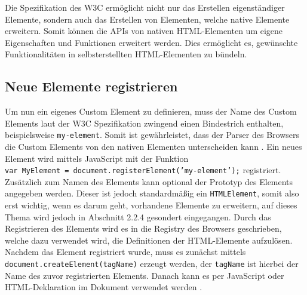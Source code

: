 \begin{Shaded}
\begin{Highlighting}[]
  \KeywordTok{>}
\KeywordTok{>}
\end{Highlighting}
\end{Shaded}

Die Spezifikation des W3C ermöglicht nicht nur das Erstellen eigenständiger Elemente, sondern auch das Erstellen von Elementen, welche native Elemente erweitern. Somit können die APIs von nativen HTML-Elementen um eigene Eigenschaften und Funktionen erweitert werden. Dies ermöglicht es, gewünschte Funktionalitäten in selbsterstellten HTML-Elementen zu bündeln.

\subsection{Neue Elemente registrieren}\label{neue-elemente-registrieren}

Um nun ein eigenes Custom Element zu definieren, muss der Name des Custom Elements laut der W3C Spezifikation zwingend einen Bindestrich enthalten, beispielsweise \texttt{my-element}. Somit ist gewährleistet, dass der Parser des Browsers die Custom Elements von den nativen Elementen unterscheiden kann \cite{citeulike:13845061}. Ein neues Element wird mittels JavaScript mit der Funktion \texttt{var\ MyElement\ =\ document.registerElement('my-element');} registriert. Zusätzlich zum Namen des Elements kann optional der Prototyp des Elements angegeben werden. Dieser ist jedoch standardmäßig ein \texttt{HTMLElement}, somit also erst wichtig, wenn es darum geht, vorhandene Elemente zu erweitern, auf dieses Thema wird jedoch in Abschnitt 2.2.4 gesondert eingegangen. Durch das Registrieren des Elements wird es in die Registry des Browsers geschrieben, welche dazu verwendet wird, die Definitionen der HTML-Elemente aufzulösen. Nachdem das Element registriert wurde, muss es zunächst mittels \texttt{document.createElement(tagName)} erzeugt werden, der \texttt{tagName} ist hierbei der Name des zuvor registrierten Elements. Danach kann es per JavaScript oder HTML-Deklaration im Dokument verwendet werden \cite{citeulike:13844975} .

